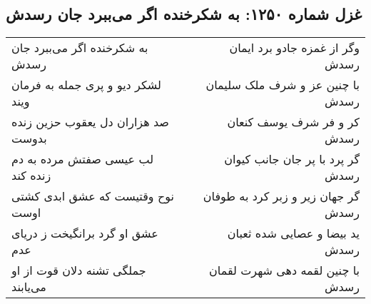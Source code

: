 \begin{center}
\section*{غزل شماره ۱۲۵۰: به شکرخنده اگر می‌ببرد جان رسدش}
\label{sec:1250}
\begin{longtable}{l p{0.5cm} r}
به شکرخنده اگر می‌ببرد جان رسدش
&&
وگر از غمزه جادو برد ایمان رسدش
\\
لشکر دیو و پری جمله به فرمان ویند
&&
با چنین عز و شرف ملک سلیمان رسدش
\\
صد هزاران دل یعقوب حزین زنده بدوست
&&
کر و فر شرف یوسف کنعان رسدش
\\
لب عیسی صفتش مرده به دم زنده کند
&&
گر پرد با پر جان جانب کیوان رسدش
\\
نوح وقتیست که عشق ابدی کشتی اوست
&&
گر جهان زیر و زبر کرد به طوفان رسدش
\\
عشق او گرد برانگیخت ز دریای عدم
&&
ید بیضا و عصایی شده ثعبان رسدش
\\
جملگی تشنه دلان قوت از او می‌یابند
&&
با چنین لقمه دهی شهرت لقمان رسدش
\\
\end{longtable}
\end{center}
